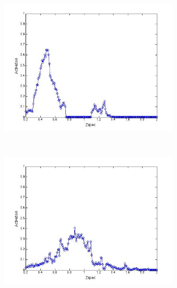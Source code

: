 \documentclass[useAMS,usenatbib,fleqn]{mn2e}
\begin{document}
\begin{figure}
\begin{subfigure}[b]{0.075\textwidth}
                \includegraphics[trim = 35px 15px 50px 25px, clip=true,width=\textwidth]{activation_07.jpg}
        \end{subfigure}
        ~
        \begin{subfigure}[b]{0.075\textwidth}
                \includegraphics[trim = 35px 15px 50px 25px, clip=true,width=\textwidth]{activation_08.jpg}
        \end{subfigure}
        ~
        \begin{subfigure}[b]{0.075\textwidth}

\end{subfigure}
\end{figure}
\end{document}
